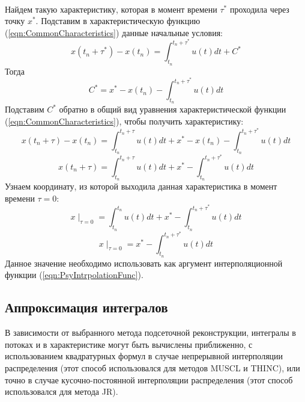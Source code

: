 \documentclass[12pt,a4paper]{article}
\begin{document}
\\Найдем такую характеристику, которая в момент времени $\tau^*$ проходила через точку $x^*$. Подставим в характеристическую функцию (\ref{eqn:CommonCharacteristics}) данные начальные условия:
\[
x(t_n+\tau^*)-x(t_n)=\int_{t_n}^{t_n+\tau^*}u(t)dt + C^*
\]
Тогда
\[
C^* = x^*-x(t_n)-\int_{t_n}^{t_n+\tau^*}u(t)dt
\]
Подставим $C^*$ обратно в общий вид уравнения характеристической функции (\ref{eqn:CommonCharacteristics}), чтобы получить характеристику:
\[
x(t_n+\tau)-x(t_n)=\int_{t_n}^{t_n+\tau}u(t)dt + x^*-x(t_n)-\int_{t_n}^{t_n+\tau^*}u(t)dt
\]
\begin{equation}
\label{eqn:Characteristic}
x(t_n+\tau)=\int_{t_n}^{t_n+\tau}u(t)dt + x^*-\int_{t_n}^{t_n+\tau^*}u(t)dt
\end{equation}
Узнаем координату, из которой выходила данная характеристика в момент времени $\tau=0$:
\[
x\mid_{\tau=0}=\int_{t_n}^{t_n}u(t)dt + x^*-\int_{t_n}^{t_n+\tau^*}u(t)dt
\]
\begin{equation}
\label{eqn:CharacteristicFromZero}
x\mid_{\tau=0}=x^*-\int_{t_n}^{t_n+\tau^*}u(t)dt
\end{equation}
Данное значение необходимо использовать как аргумент интерполяционной функции (\ref{eqn:PsyIntrpolationFunc}).

\subsection{Аппроксимация интегралов}
В зависимости от выбранного метода подсеточной реконструкции, интегралы в потоках и в характеристике могут быть вычислены приближенно, с использованием квадратурных формул в случае непрерывной интерполяции распределения (этот способ использовался для методов MUSCL и THINC), или точно в случае кусочно-постоянной интерполяции распределения (этот способ использовался для метода JR).
\end{document}
